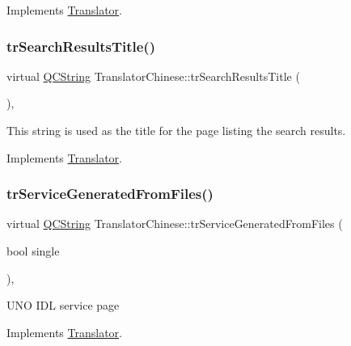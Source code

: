 Implements \mbox{\hyperlink{class_translator}{Translator}}.

\mbox{\label{class_translator_chinese_ac651391a9c3735b824c3f07817b06051}} 
\subsubsection{\texorpdfstring{trSearchResultsTitle()}{trSearchResultsTitle()}}
{\footnotesize\ttfamily virtual \mbox{\hyperlink{class_q_c_string}{Q\+C\+String}} Translator\+Chinese\+::tr\+Search\+Results\+Title (\begin{DoxyParamCaption}{ }\end{DoxyParamCaption})\hspace{0.3cm}{\ttfamily [inline]}, {\ttfamily [virtual]}}

This string is used as the title for the page listing the search results. 

Implements \mbox{\hyperlink{class_translator}{Translator}}.

\mbox{\label{class_translator_chinese_a671d2015874c4f74364b07e27ba278e6}} 
\subsubsection{\texorpdfstring{trServiceGeneratedFromFiles()}{trServiceGeneratedFromFiles()}}
{\footnotesize\ttfamily virtual \mbox{\hyperlink{class_q_c_string}{Q\+C\+String}} Translator\+Chinese\+::tr\+Service\+Generated\+From\+Files (\begin{DoxyParamCaption}\item[{bool}]{single }\end{DoxyParamCaption})\hspace{0.3cm}{\ttfamily [inline]}, {\ttfamily [virtual]}}

U\+NO I\+DL service page 

Implements \mbox{\hyperlink{class_translator}{Translator}}.

\mbox{\label{class_translator_chinese_a544a88b436eab3df6726d41c7629af93}} 
